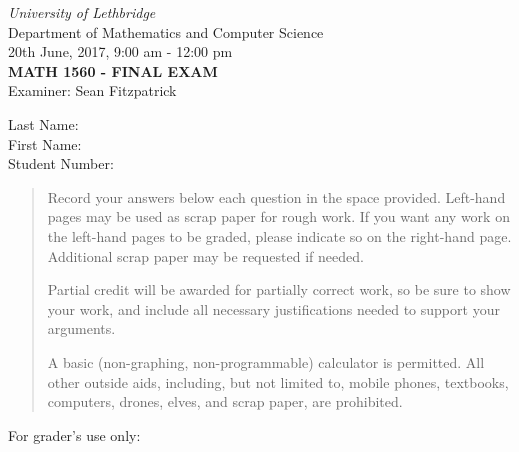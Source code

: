 \documentclass[12pt]{article}
\newcommand{\skipline}{\vspace{12pt}}
\begin{document}
\author{Instructor: Sean Fitzpatrick}
\thispagestyle{plain}
\begin{center}
\emph{University of Lethbridge}\\
Department of Mathematics and Computer Science\\
20th June, 2017, 9:00 am - 12:00 pm\\
{\bf MATH 1560 - FINAL EXAM}\\
Examiner: Sean Fitzpatrick
\end{center}
\skipline \skipline \skipline \noindent \skipline
Last Name:\underline{\hspace{350pt}}\\
\skipline
First Name:\underline{\hspace{348pt}}\\
\skipline
Student Number:\underline{\hspace{322pt}}\\
\skipline



\vspace{0.1in}


\begin{quote}

 
 Record your answers below each question in the space provided.    Left-hand pages may be used as scrap paper for rough work.  If you want any work on the left-hand pages to be graded, please indicate so on the right-hand page. Additional scrap paper may be requested if needed.
 
 \bigskip
 
 Partial credit will be awarded for partially correct work, so be sure to show your work, and include all necessary justifications needed to support your arguments. 

\bigskip

 A basic (non-graphing, non-programmable) calculator is permitted. All other outside aids, including, but not limited to, mobile phones, textbooks, computers, drones, elves, and scrap paper, are prohibited.
\end{quote}


\bigskip

For grader's use only:
\end{document}
